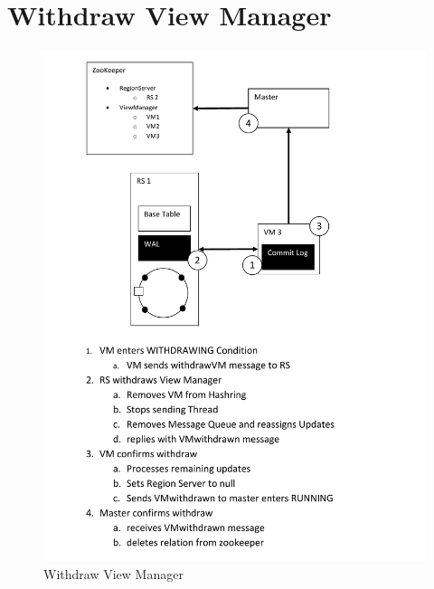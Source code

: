 \section{Withdraw View Manager}
\begin{figure}[h!]
  \centering
    \includegraphics[scale=0.8]{figures/SO_WithdrawViewManager}
     \caption{Withdraw View Manager}
    \label{fig:withdrawviewmanager}
\end{figure}
\newpage
